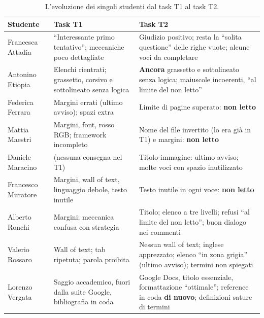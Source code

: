 \begin{table}[htbp]
  \centering
  \caption{L'evoluzione dei singoli studenti dal task T1 al task T2.}
  \label{rv:t2:tab:studenti}
  \small
  \begin{tabular}{@{}p{2.3cm}p{4.3cm}p{5.1cm}@{}}
    \toprule
    \textbf{Studente} & \textbf{Task T1} & \textbf{Task T2} \\
    \midrule
    Francesca Attadia &
      ``Interessante primo tentativo''; meccaniche poco dettagliate &
      Giudizio positivo; resta la ``solita questione'' delle righe vuote;
      alcune voci da completare \\
    \addlinespace
    Antonino Etiopia &
      Elenchi rientrati; grassetto, corsivo e sottolineato senza logica &
      \textbf{Ancora} grassetto e sottolineato senza logica; maiuscole
      incoerenti, ``al limite del non letto'' \\
    \addlinespace
    Federica Ferrara &
      Margini errati (ultimo avviso); spazi extra &
      Limite di pagine superato: \textbf{non letto} \\
    \addlinespace
    Mattia Maestri &
      Margini, font, rosso RGB; framework incompleto &
      Nome del file invertito (lo era già in T1) e margini: \textbf{non
      letto} \\
    \addlinespace
    Daniele Maracino &
      (nessuna consegna nel T1) &
      Titolo-immagine: ultimo avviso; molte voci con spazio inutilizzato \\
    \addlinespace
    Francesco Muratore &
      Margini, wall of text, linguaggio debole, testo inutile &
      Testo inutile in ogni voce: \textbf{non letto} \\
    \addlinespace
    Alberto Ronchi &
      Margini; meccanica confusa con strategia &
      Titolo; elenco a tre livelli; refusi ``al limite del non letto'';
      buon dialogo nei commenti \\
    \addlinespace
    Valerio Rossaro &
      Wall of text; tab ripetuta; parola proibita &
      Nessun wall of text; inglese apprezzato; elenco ``in zona grigia''
      (ultimo avviso); termini non spiegati \\
    \addlinespace
    Lorenzo Vergata &
      Saggio accademico, fuori dalla suite Google, bibliografia in coda &
      Google Docs, titolo essenziale, formattazione ``ottimale''; reference
      in coda \textbf{di nuovo}; definizioni sature di termini \\
    \bottomrule
  \end{tabular}
\end{table}

